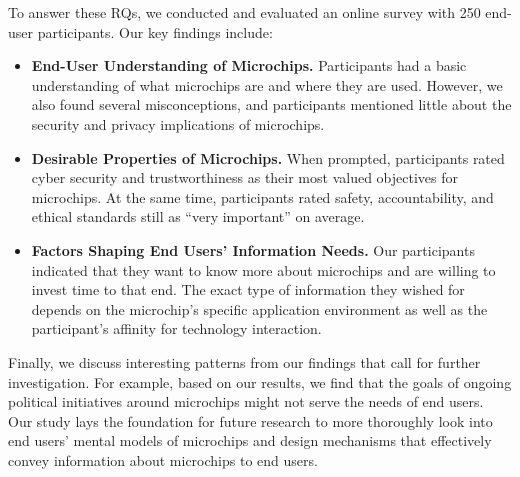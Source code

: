To answer these \acp{RQ}, we conducted and evaluated an online survey with 250 end-user participants. 
Our key findings include:
\begin{itemize}
    \item \textbf{End-User Understanding of Microchips.} 
    Participants had a basic understanding of what microchips are and where they are used. 
    However, we also found several misconceptions, and participants mentioned little about the %
    security and privacy implications of microchips.
    
    \item \textbf{Desirable Properties of Microchips.} 
    When prompted, participants rated cyber security and trustworthiness as their most valued objectives for microchips. 
    At the same time, participants rated safety, accountability, and ethical standards still as \enquote{very important} on average.
    
    \item \textbf{Factors Shaping End Users' Information Needs.} 
    Our participants indicated that they want to know more about microchips and are willing to invest time to that end. 
    The exact type of information they wished for depends on the microchip's specific application environment as well as the participant's affinity for technology interaction.
\end{itemize}

Finally, we discuss interesting patterns from our findings that call for further investigation. 
For example, based on our results, we find that the goals of ongoing political initiatives around microchips might not serve the needs of end users. 
Our study lays the foundation for future research to more thoroughly look into end users' mental models of microchips and design mechanisms that effectively convey information about microchips to end users.
